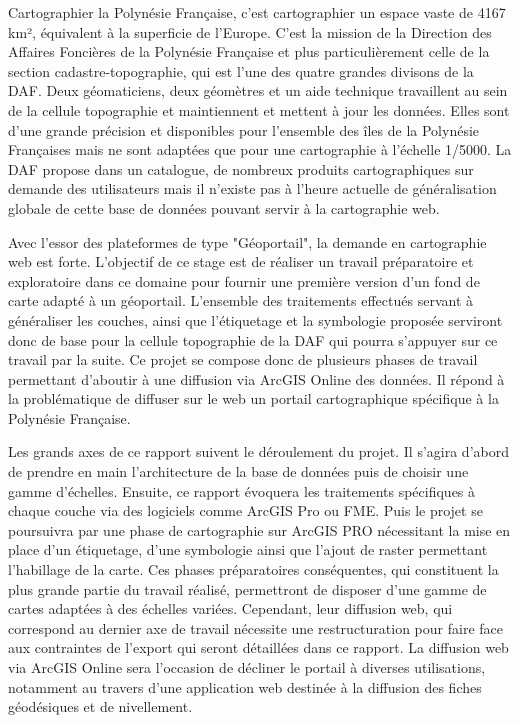 \documentclass{themeensg}
\begin{document}
  \vspace{1.5cm}
	Cartographier la Polynésie Française, c'est cartographier un espace vaste de 4167 km², équivalent à la superficie de l’Europe. C'est la mission de la Direction des Affaires Foncières de la Polynésie Française et plus particulièrement celle de la section cadastre-topographie, qui est l'une des quatre grandes divisons de la DAF. Deux géomaticiens, deux géomètres et un aide technique travaillent au sein de la cellule topographie et maintiennent et mettent à jour les données. Elles sont d'une grande précision et disponibles pour l'ensemble des îles de la Polynésie Françaises mais ne sont adaptées que pour une cartographie à l'échelle 1/5000. La DAF propose dans un catalogue, de nombreux produits cartographiques sur demande des utilisateurs mais il n'existe pas à l'heure actuelle de généralisation globale de cette base de données pouvant servir à la cartographie web.
	
	Avec l'essor des plateformes de type "Géoportail", la demande en cartographie web est forte. L'objectif de ce stage est de réaliser un travail préparatoire et exploratoire dans ce domaine pour fournir une première version d'un fond de carte adapté à un géoportail. L'ensemble des traitements effectués servant à généraliser les couches, ainsi que l'étiquetage et la symbologie proposée serviront donc de base pour la cellule topographie de la DAF qui pourra s'appuyer sur ce travail par la suite. Ce projet se compose donc de plusieurs phases de travail permettant d'aboutir à une diffusion via ArcGIS Online des données. Il répond à la problématique de diffuser sur le web un portail cartographique spécifique à la Polynésie Française.
	
	Les grands axes de ce rapport suivent le déroulement du projet. Il s'agira d'abord de prendre en main l'architecture de la base de données puis de choisir une gamme d'échelles. Ensuite, ce rapport évoquera les traitements spécifiques à chaque couche via des logiciels comme ArcGIS Pro ou FME. Puis le projet se poursuivra par une phase de cartographie sur ArcGIS PRO nécessitant la mise en place d'un étiquetage, d'une symbologie ainsi que l'ajout de raster permettant l'habillage de la carte. Ces phases préparatoires conséquentes, qui constituent la plus grande partie du travail réalisé, permettront de disposer d'une gamme de cartes adaptées à des échelles variées. Cependant, leur diffusion web, qui correspond au dernier axe de travail nécessite une restructuration pour faire face aux contraintes de l'export qui seront détaillées dans ce rapport. La diffusion web via ArcGIS Online sera l'occasion de décliner le portail à diverses utilisations, notamment au travers d'une application web destinée à la diffusion des fiches géodésiques et de nivellement. 
  
\end{document}
